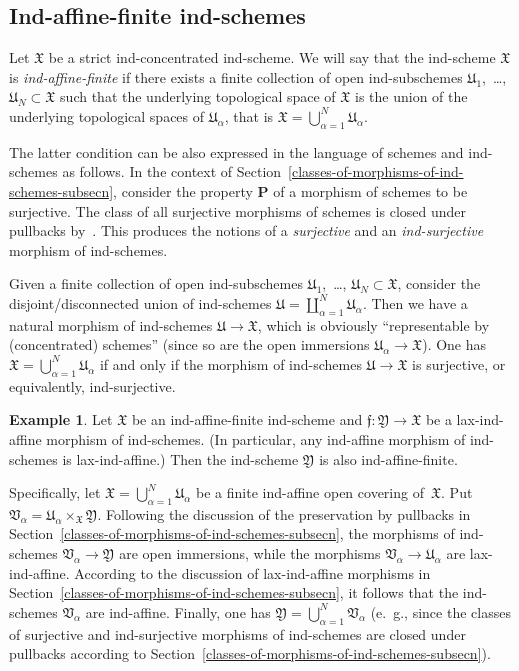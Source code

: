 \documentclass[12pt,a4paper]{amsart}
\newcommand{\+}{\protect\nobreakdash-}
\renewcommand{\:}{\colon}
\newcommand{\rarrow}{\longrightarrow}
\newcommand{\bP}{\mathbf P}
\newcommand{\fX}{\mathfrak X}
\newcommand{\fY}{\mathfrak Y}
\newcommand{\fU}{\mathfrak U}
\newcommand{\fV}{\mathfrak V}
\newcommand{\ff}{\mathfrak f}
\theoremstyle{plain}
\theoremstyle{definition}
\newtheorem{ex}[thm]{Example}
\begin{document}
\subsection{Ind-affine-finite ind-schemes}
 Let $\fX$ be a strict ind-concentrated ind-scheme.
 We will say that the ind-scheme $\fX$ is \emph{ind-affine-finite}
if there exists a finite collection of open ind-subschemes
$\fU_1$,~\dots, $\fU_N\subset\fX$ such that the underlying
topological space of $\fX$ is the union of the underlying topological
spaces of $\fU_\alpha$, that is $\fX=\bigcup_{\alpha=1}^N\fU_\alpha$.

 The latter condition can be also expressed in the language of
schemes and ind-schemes as follows.
 In the context of
Section~\ref{classes-of-morphisms-of-ind-schemes-subsecn}, consider
the property $\bP$ of a morphism of schemes to be surjective.
 The class of all surjective morphisms of schemes is closed under
pullbacks by~\cite[Lemma Tag~01S1]{SP}.
 This produces the notions of a \emph{surjective} and
an \emph{ind-surjective} morphism of ind-schemes.

 Given a finite collection of open ind-subschemes
$\fU_1$,~\dots, $\fU_N\subset\fX$, consider the disjoint/disconnected
union of ind-schemes $\fU=\coprod_{\alpha=1}^N\fU_\alpha$.
 Then we have a natural morphism of ind-schemes $\fU\rarrow\fX$,
which is obviously ``representable by (concentrated) schemes''
(since so are the open immersions $\fU_\alpha\rarrow\fX$).
 One has $\fX=\bigcup_{\alpha=1}^N\fU_\alpha$ if and only if
the morphism of ind-schemes $\fU\rarrow\fX$ is surjective, or
equivalently, ind-surjective.

\begin{ex} \label{ind-affine-over-ind-affine-finite-example}
 Let $\fX$ be an ind-affine-finite ind-scheme and $\ff\:\fY\rarrow\fX$
be a lax-ind-affine morphism of ind-schemes.
 (In particular, any ind-affine morphism of ind-schemes is
lax-ind-affine.)
 Then the ind-scheme $\fY$ is also ind-affine-finite.

 Specifically, let $\fX=\bigcup_{\alpha=1}^N\fU_\alpha$ be a finite
ind-affine open covering of~$\fX$.
 Put $\fV_\alpha=\fU_\alpha\times_\fX\fY$.
 Following the discussion of the preservation by pullbacks in
Section~\ref{classes-of-morphisms-of-ind-schemes-subsecn},
the morphisms of ind-schemes $\fV_\alpha\rarrow\fY$ are open immersions,
while the morphisms $\fV_\alpha\rarrow\fU_\alpha$ are lax-ind-affine.
 According to the discussion of lax-ind-affine morphisms
in Section~\ref{classes-of-morphisms-of-ind-schemes-subsecn}, it
follows that the ind-schemes $\fV_\alpha$ are ind-affine.
 Finally, one has $\fY=\bigcup_{\alpha=1}^N\fV_\alpha$ (e.~g.,
since the classes of surjective and ind-surjective morphisms of
ind-schemes are closed under pullbacks according to
Section~\ref{classes-of-morphisms-of-ind-schemes-subsecn}).
\end{ex}
\end{document}
